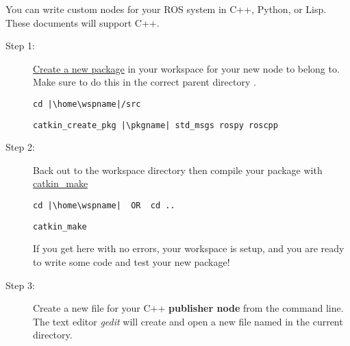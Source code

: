 \documentclass[12pt]{article}
\begin{document}
\begin{description}[labelindent=1cm]
\begin{description}
	\end{description}
	
	\newpage
	\item[\textbf{\underline{Part II - Create A \href{http://wiki.ros.org/ROS/Tutorials/WritingPublisherSubscriber(c++)}{{\bf Publisher }}Node:}}] \hfill \vspace{0mm}
	   
	   You can write custom nodes for your ROS system in C++, Python, or Lisp. These documents will support C++.
	         \begin{description}    				
	          \item [Step 1:] \href{http://wiki.ros.org/ROS/Tutorials/CreatingPackage}{Create a new package} in your workspace for your new node to belong to. Make sure to do this in the correct parent directory .
	\begin{verbatim} 
cd |\home\wspname|/src
	\end{verbatim}
	
	\begin{verbatim} 
catkin_create_pkg |\pkgname| std_msgs rospy roscpp
	\end{verbatim}
	            
	            
	\item [Step 2:] Back out to the workspace directory then compile your package with \href{http://wiki.ros.org/catkin/Tutorials/using_a_workspace#Building_Packages_in_a_catkin_Workspace}{catkin\_make} 
	
	\begin{verbatim}  
cd |\home\wspname| 	OR 	cd ..
	\end{verbatim}
	             
	\begin{verbatim}  
catkin_make
	\end{verbatim}
	            
	
	If you get here with no errors, your workspace is setup, and you are ready to write some code and test your new package!
	            
	            
	\newpage
	\item [Step 3:] Create a new file for your C++ {\bf publisher node} from the command line. The text editor {\it gedit} will create and open a new file named \nodname in the current directory.
	
	

\end{description}
\end{description}
\end{document}
